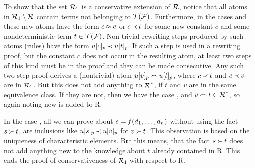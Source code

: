 \begin{PROOF}
To show that the set \(\C R_1\) is a conservative extension of \(\C R\),
notice that all atoms in \(\C R_1\setminus\C R\) contain terms not
belonging to \(\Terms\Funcs\). Furthermore, in the cases  and
 these new atoms have the form \(c\Eq c\) or \(c\Incl t\) for some
new constant $c$ and some nondeterministic term \(t\in\Terms\Funcs\). Non-trivial
rewriting steps produced by such atoms (rules) have the form \(u[c]_p\Incl
u[t]_p\). If such a step is used in a rewriting proof, but the constant \(c\)
does not occur in the resulting atom, at least two steps of this kind must be
in the proof and they can be made consecutive. Any such two-step proof derives a
(nontrivial) atom \(u[v]_p\Int u[t]_p\), where \(c\Incl t\) and \(c\Incl v\)
are in \(\C R_1\). But this does not add anything to \(\C R^\ast\), if \(t\) and
\(v\) are in the same equivalence class. If they are not, then we have the
case , and \(v\Int t\in\C R^\ast\), so again noting new is added
to \C R. 

In the case , all we can prove about
\(s=f(\List dn,)\) without using the fact \(s\Cont t\), are inclusions like
\(u[s]_p\Incl u[v]_p\) for \(v\Cont t\). This observation is based on the
uniqueness of characteristic elements. But this means, that the fact \(s\Cont
t\) does not add anything new to the knowledge about \(t\) already contained in \C
R. This ends the proof of conservativeness of \(\C R_1\) with respect to \C R.


\end{PROOF}
